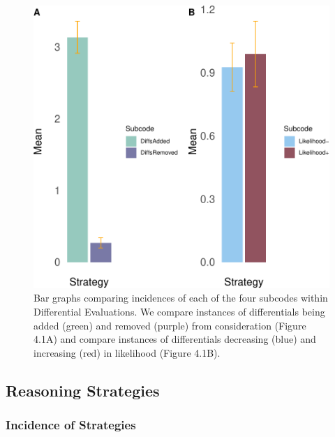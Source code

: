 \documentclass[a4paper, nobind]{templates/ociamthesis}
\begin{document}
\begin{figure}[H]

{\centering \includegraphics[width=1\linewidth]{_main_files/figure-latex/diffbarsplot-1} 

}

\caption{Bar graphs comparing incidences of each of the four subcodes within Differential Evaluations. We compare instances of differentials being added (green) and removed (purple) from consideration (Figure 4.1A) and compare instances of differentials decreasing (blue) and increasing (red) in likelihood (Figure 4.1B).}\label{fig:diffbarsplot}
\end{figure}

\subsection{Reasoning Strategies}\label{reasoning-strategies}

\subsubsection{Incidence of Strategies}\label{incidence-of-strategies}
\end{document}
